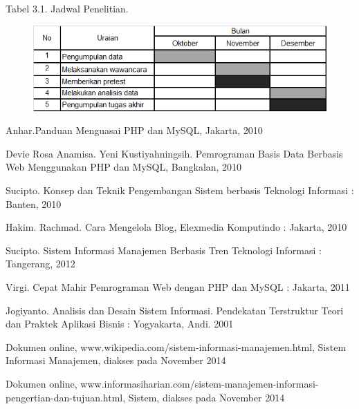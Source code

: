 \documentclass{jtetiproposalskripsi}
\begin{document}
\begin{center}
Tabel 3.1. Jadwal Penelitian.
\end{center}
\vspace{-0.5cm}
\begin{figure}[ht!]
  \centering
    \includegraphics[width=17cm]{gambar/3}
\end{figure}


\begin{thebibliography}{9}

Anhar.Panduan Menguasai PHP dan MySQL, Jakarta, 2010

Devie Rosa Anamisa. Yeni Kustiyahningsih. Pemrograman Basis Data Berbasis Web Menggunakan PHP dan MySQL, Bangkalan, 2010

Sucipto. Konsep dan Teknik Pengembangan Sistem berbasis Teknologi Informasi : Banten, 2010

Hakim. Rachmad. Cara Mengelola Blog, Elexmedia Komputindo : Jakarta, 2010

Sucipto. Sistem Informasi Manajemen Berbasis Tren Teknologi Informasi : Tangerang, 2012

Virgi. Cepat Mahir Pemrograman Web dengan PHP dan MySQL : Jakarta, 2011

Jogiyanto. Analisis dan Desain Sistem Informasi. Pendekatan Terstruktur Teori dan Praktek Aplikasi Bisnis : Yogyakarta, Andi. 2001

Dokumen online, www.wikipedia.com/sistem-informasi-manajemen.html, Sistem Informasi Manajemen, diakses pada November 2014

Dokumen online, www.informasiharian.com/sistem-manajemen-informasi-pengertian-dan-tujuan.html, Sistem, diakses pada November 2014

\end{thebibliography}
\end{document}
